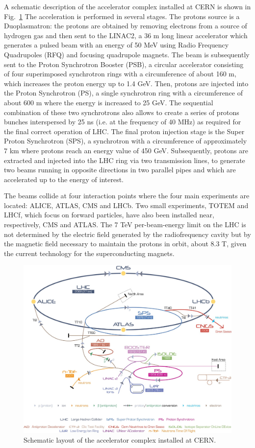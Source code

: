 A schematic description of the accelerator complex installed at CERN is shown in Fig.~\ref{lhc}
The acceleration is performed in several stages. The protons source is
a Duoplasmatron: the protons are obtained by removing electrons from a
source of hydrogen gas 
and then sent to the LINAC2, a 36 m long linear accelerator which generates a pulsed
beam with an energy of 50 MeV using Radio Frequency Quadrupoles (RFQ) and focusing
quadrupole magnets. The beam is subsequently sent to the Proton Synchrotron Booster
(PSB), a circular accelerator consisting of four superimposed synchrotron rings with a
circumference of about 160 m, which increases the proton energy up to 1.4 GeV. Then,
protons are injected into the Proton Synchrotron (PS), a single synchrotron ring with a
circumference of about 600 m where the energy is increased to 25 GeV. The sequential combination of these two synchrotrons also allows to create a series of protons bunches
interspersed by 25 ns (i.e. at the frequency of 40 MHz) as required for the final correct
operation of LHC. The final proton injection stage is the Super Proton Synchrotron (SPS),
a synchrotron with a circumference of approximately 7 km where protons reach an energy
value of 450 GeV. Subsequently, protons are extracted and injected into the LHC ring
via two transmission lines, to generate two beams running in opposite directions in two
parallel pipes and which are accelerated up to the energy of interest.

The beams collide
at four interaction points where the four main experiments are
located: ALICE, ATLAS, CMS and LHCb. Two small experiments, TOTEM and
LHCf, which focus on forward particles, have also been installed near,
respectively, CMS and ATLAS.
The 7 TeV per-beam-energy limit on the LHC
is not determined by the electric field generated by the radiofrequency cavity but by the
magnetic field necessary to maintain the protons in orbit, about 8.3 T, given the current technology
for the superconducting magnets.
\begin{figure}
\centering
\includegraphics[scale= 0.6]{../Cap2/lhc_cern}
\caption{Schematic layout of the accelerator complex installed at CERN.}
\label{lhc}
\end{figure}


